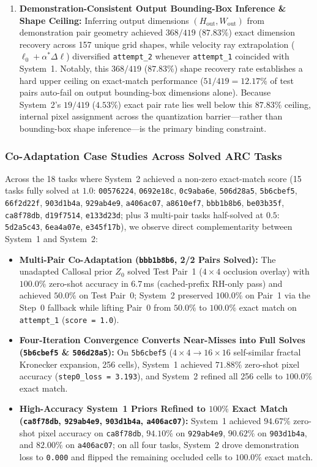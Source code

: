 \documentclass[11pt,a4paper]{article}
\theoremstyle{plain}
\theoremstyle{definition}
\theoremstyle{remark}
\begin{document}
\begin{enumerate}
    \item \textbf{Demonstration-Consistent Output Bounding-Box Inference \& Shape Ceiling:} Inferring output dimensions $(H_{\mathrm{out}}, W_{\mathrm{out}})$ from demonstration pair geometry achieved $368 / 419$ ($87.83\%$) exact dimension recovery across 157 unique grid shapes, while velocity ray extrapolation ($\ell_0 + \alpha^* \Delta \ell$) diversified \texttt{attempt\_2} whenever \texttt{attempt\_1} coincided with System~1. Notably, this $368 / 419$ ($87.83\%$) shape recovery rate establishes a hard upper ceiling on exact-match performance ($51 / 419 = 12.17\%$ of test pairs auto-fail on output bounding-box dimensions alone). Because System~2's $19 / 419$ ($4.53\%$) exact pair rate lies well below this $87.83\%$ ceiling, internal pixel assignment across the quantization barrier---rather than bounding-box shape inference---is the primary binding constraint.
\end{enumerate}

\subsubsection{Co-Adaptation Case Studies Across Solved ARC Tasks}
Across the 18 tasks where System~2 achieved a non-zero exact-match score (15 tasks fully solved at $1.0$: \texttt{00576224}, \texttt{0692e18c}, \texttt{0c9aba6e}, \texttt{506d28a5}, \texttt{5b6cbef5}, \texttt{66f2d22f}, \texttt{903d1b4a}, \texttt{929ab4e9}, \texttt{a406ac07}, \texttt{a8610ef7}, \texttt{bbb1b8b6}, \texttt{be03b35f}, \texttt{ca8f78db}, \texttt{d19f7514}, \texttt{e133d23d}; plus 3 multi-pair tasks half-solved at $0.5$: \texttt{5d2a5c43}, \texttt{6ea4a07e}, \texttt{e345f17b}), we observe direct complementarity between System~1 and System~2:
\begin{itemize}
    \item \textbf{Multi-Pair Co-Adaptation (\texttt{bbb1b8b6}, 2/2 Pairs Solved):} The unadapted Callosal prior $Z_0$ solved Test Pair~1 ($4\times 4$ occlusion overlay) with $100.0\%$ zero-shot accuracy in $6.7$\,ms (cached-prefix RH-only pass) and achieved $50.0\%$ on Test Pair~0; System~2 preserved $100.0\%$ on Pair~1 via the Step~0 fallback while lifting Pair~0 from $50.0\%$ to $100.0\%$ exact match on \texttt{attempt\_1} (\texttt{score = 1.0}).
    \item \textbf{Four-Iteration Convergence Converts Near-Misses into Full Solves (\texttt{5b6cbef5} \& \texttt{506d28a5}):} On \texttt{5b6cbef5} ($4\times 4 \to 16\times 16$ self-similar fractal Kronecker expansion, 256 cells), System~1 achieved $71.88\%$ zero-shot pixel accuracy (\texttt{step0\_loss = 3.193}), and System~2 refined all 256 cells to $100.0\%$ exact match.
    \item \textbf{High-Accuracy System~1 Priors Refined to $100\%$ Exact Match (\texttt{ca8f78db}, \texttt{929ab4e9}, \texttt{903d1b4a}, \texttt{a406ac07}):} System~1 achieved $94.67\%$ zero-shot pixel accuracy on \texttt{ca8f78db}, $94.10\%$ on \texttt{929ab4e9}, $90.62\%$ on \texttt{903d1b4a}, and $82.00\%$ on \texttt{a406ac07}; on all four tasks, System~2 drove demonstration loss to \texttt{0.000} and flipped the remaining occluded cells to $100.0\%$ exact match.
\end{itemize}
\end{document}
